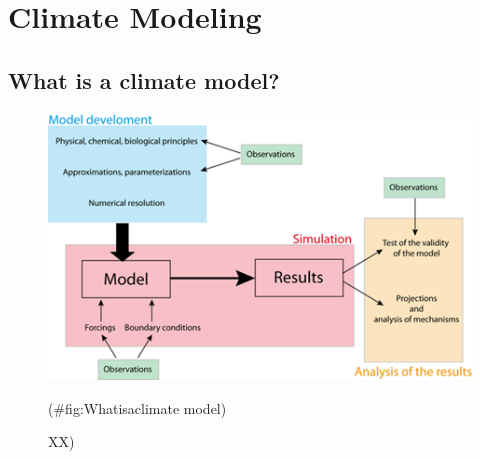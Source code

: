 \documentclass[12pt,oneside]{book}
\begin{document}
\section{Climate Modeling}\label{climate-modeling}

\subsection{What is a climate model?}\label{what-is-a-climate-model}

\begin{figure}

{\centering \includegraphics[width=0.8\linewidth]{figures/Figure78} 

}

\caption{XX)}(\#fig:Whatisaclimate model)
\end{figure}
\end{document}
